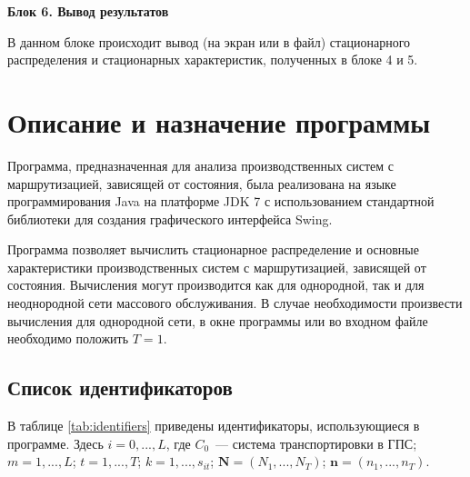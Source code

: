 \medskip
\textbf{Блок 6. Вывод результатов}

В данном блоке происходит вывод (на экран или в файл) стационарного распределения и стационарных характеристик, полученных в блоке 4 и 5.\\




\section{Описание и назначение программы}
\label{sec:program_description_and_purpose}

Программа, предназначенная для  анализа производственных систем с маршрутизацией, зависящей от состояния, была реализована на языке программирования Java на платформе JDK 7 с использованием стандартной библиотеки для создания графического интерфейса Swing.

Программа позволяет вычислить стационарное распределение и основные характеристики производственных систем с маршрутизацией, зависящей от состояния. Вычисления могут производится как для однородной, так и для неоднородной сети массового обслуживания. В случае необходимости произвести вычисления для однородной сети, в окне программы или во входном файле необходимо положить $T=1$.

\subsection{Список идентификаторов}
\label{subsec:ID_list}

В таблице \ref{tab:identifiers} приведены идентификаторы, использующиеся в программе. Здесь $i=0,...,L$, где $C_0$~--- система транспортировки в ГПС; $m=1,...,L$; $t=1,...,T$; $k=1,...,s_{it}$;  $\mathbf{N}=(N_1,...,N_T)$; $\mathbf{n}=(n_1,...,n_T)$.

